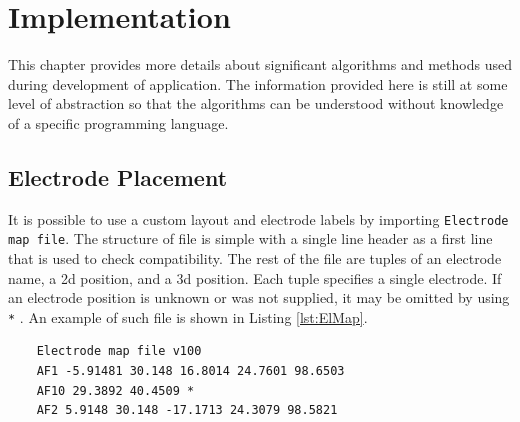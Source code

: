 \chapter{Implementation}
\label{implementation}
This chapter provides more details about significant algorithms and methods used during  development of application. The information provided here is still at some level of abstraction 
so that the algorithms can be understood without knowledge of a specific programming language.

\section{Electrode Placement}
\label{sec:implElPlacement}
It is possible to use a custom layout and electrode labels by importing \texttt{Electrode map file}. The structure of file is simple with a single line header as a first line that is used to check compatibility. The rest of the file are tuples of an electrode name, a \gls{2d} position, and a \gls{3d} position. Each tuple specifies a single electrode. If an electrode position is unknown or was not supplied, it may be omitted by using \texttt{*} . An example of such file is shown in Listing \ref{lst:ElMap}.

\lstset{captionpos=b, caption=Electrode map file example, label=lst:ElMap}
\begin{lstlisting}
    Electrode map file v100
    AF1 -5.91481 30.148 16.8014 24.7601 98.6503
    AF10 29.3892 40.4509 *
    AF2 5.9148 30.148 -17.1713 24.3079 98.5821
\end{lstlisting}

